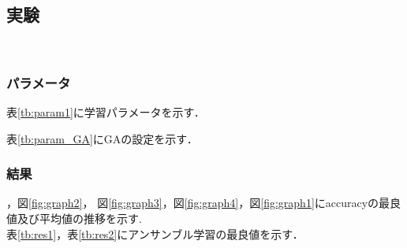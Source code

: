 \documentclass[twocolumn]{jarticle}     %
\begin{document}
\subsection{実験}　
\subsubsection{パラメータ}
表\ref{tb:param1}に学習パラメータを示す．
\begin{table}[h]
	\centering
	\caption{学習パラメータ\label{tb:param1}}
\end{table}
 表\ref{tb:param_GA}にGAの設定を示す．
\begin{table}[h]
	\centering
	\caption{実験パラメータ\label{tb:param_GA}}
\end{table}
\subsubsection{結果}
，図\ref{fig:graph2}，
図\ref{fig:graph3}，図\ref{fig:graph4}，図\ref{fig:graph1}にaccuracyの最良値及び平均値の推移を示す.\\

表\ref{tb:res1}，表\ref{tb:res2}にアンサンブル学習の最良値を示す．\\
\end{document}
